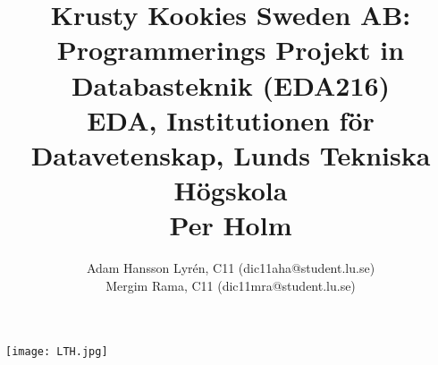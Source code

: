 \documentclass[a4paper]{article}%
\title{
	Krusty Kookies Sweden AB: Programmerings Projekt in Databasteknik (EDA216)\\
	EDA, Institutionen för Datavetenskap, Lunds Tekniska Högskola\\
	Per Holm}
\author{
Adam Hansson Lyrén, C11 (dic11aha@student.lu.se)\\
Mergim Rama, C11 (dic11mra@student.lu.se)\\
}
\begin{document}

\maketitle
\centerline{\texttt{[image: LTH.jpg]}}
\thispagestyle{empty}

\newpage
\setcounter{page}{1}


\tableofcontents
\newpage












\end{document}
